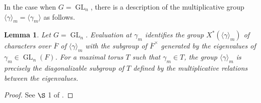 \documentclass[11pt,a4paper]{article}
\theoremstyle{definition}
\theoremstyle{plain}
\newtheorem{Le}[shared]{Lemma}
\theoremstyle{remark}
\theoremstyle{plain}
\DeclareMathOperator{\GL}{GL}
\begin{document}
In the case when $G = \GL_n$, there is a description of the multiplicative group $\langle \gamma \rangle_m = \langle \gamma_m \rangle$ as follows.

\begin{Le}\label{deligneGLn}
    Let $G = \GL_n$. Evaluation at $\gamma_m$ identifies the group $X^*(\langle \gamma \rangle_m)$ of characters over $\overline{F}$ of $\langle \gamma \rangle_m$ with the subgroup of $\overline{F}^{\times}$ generated by the eigenvalues of $\gamma_m \in \GL_n(F)$. For a maximal torus $T$ such that $\gamma_m \in T$, the group $\langle \gamma \rangle_m$ is precisely the diagonalizable subgroup of $T$ defined by the multiplicative relations between the eigenvalues.
\end{Le}
\begin{proof}
    See $\S$ 1 of \cite{MR425033}.
\end{proof}
\end{document}
